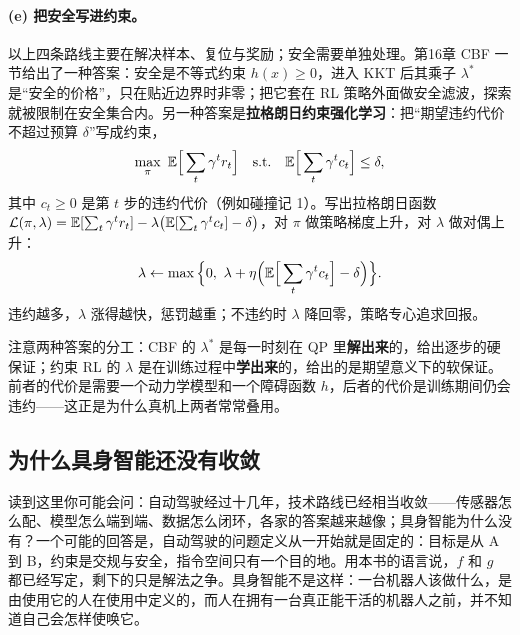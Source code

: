 \paragraph{(e) 把安全写进约束。}
以上四条路线主要在解决样本、复位与奖励；安全需要单独处理。第16章 CBF 一节给出了一种答案：安全是不等式约束 $h(x) \ge 0$，进入 KKT 后其乘子 $\lambda^*$ 是“安全的价格”，只在贴近边界时非零；把它套在 RL 策略外面做安全滤波，探索就被限制在安全集合内。另一种答案是\textbf{拉格朗日约束强化学习}：把“期望违约代价不超过预算 $\delta$”写成约束，
\begin{equation}
    \max_\pi\ \mathbb{E}\Big[\sum_t \gamma^t r_t\Big] \quad \text{s.t.}\quad \mathbb{E}\Big[\sum_t \gamma^t c_t\Big] \le \delta,
\end{equation}
其中 $c_t \ge 0$ 是第 $t$ 步的违约代价（例如碰撞记 1）。写出拉格朗日函数 $\mathcal{L}(\pi, \lambda) = \mathbb{E}[\sum_t \gamma^t r_t] - \lambda\big(\mathbb{E}[\sum_t \gamma^t c_t] - \delta\big)$，对 $\pi$ 做策略梯度上升，对 $\lambda$ 做对偶上升：
\begin{equation}
    \lambda \leftarrow \max\Big\{0,\ \lambda + \eta\Big(\mathbb{E}\Big[\sum_t \gamma^t c_t\Big] - \delta\Big)\Big\}.
\end{equation}
违约越多，$\lambda$ 涨得越快，惩罚越重；不违约时 $\lambda$ 降回零，策略专心追求回报。

注意两种答案的分工：CBF 的 $\lambda^*$ 是每一时刻在 QP 里\textbf{解出来}的，给出逐步的硬保证；约束 RL 的 $\lambda$ 是在训练过程中\textbf{学出来}的，给出的是期望意义下的软保证。前者的代价是需要一个动力学模型和一个障碍函数 $h$，后者的代价是训练期间仍会违约——这正是为什么真机上两者常常叠用。

\subsection{为什么具身智能还没有收敛}

读到这里你可能会问：自动驾驶经过十几年，技术路线已经相当收敛——传感器怎么配、模型怎么端到端、数据怎么闭环，各家的答案越来越像；具身智能为什么没有？一个可能的回答是，自动驾驶的问题定义从一开始就是固定的：目标是从 A 到 B，约束是交规与安全，指令空间只有一个目的地。用本书的语言说，$f$ 和 $g$ 都已经写定，剩下的只是解法之争。具身智能不是这样：一台机器人该做什么，是由使用它的人在使用中定义的，而人在拥有一台真正能干活的机器人之前，并不知道自己会怎样使唤它。

